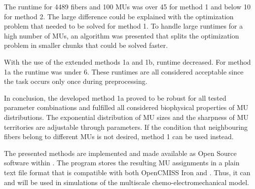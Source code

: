 The runtime for \num{4489} fibers and 100 MUs was over \SI{45}{\min} for method 1 and below \SI{10}{\sec} for method 2. The large difference could be explained with the optimization problem that needed to be solved for method 1. To handle large runtimes for a high number of MUs, an algorithm was presented that splits the optimization problem in smaller chunks that could be solved faster.

With the use of the extended methods 1a and 1b, runtime decreased. For method 1a the runtime was under \SI{6}{\min}. These runtimes are all considered acceptable since the task occurs only once during preprocessing. 

In conclusion, the developed method 1a proved to be robust for all tested parameter combinations and fulfilled all considered biophysical properties of MU distributions. The exponential distribution of MU sizes and the sharpness of MU territories are adjustable through parameters. If the condition that neighbouring fibers belong to different MUs is not desired, method 1 can be used instead.

The presented methods are implemented and made available as Open Source software within \opendihu{}.
The program stores the resulting MU assignments in a plain text file format that is compatible with both OpenCMISS Iron and \opendihu{}. Thus, it can and will be used in simulations of the multiscale chemo-electromechanical model.
